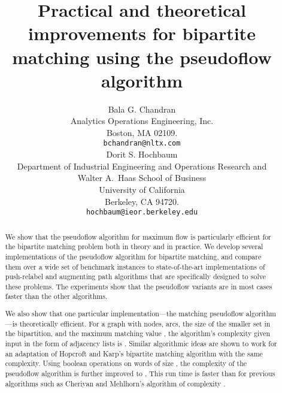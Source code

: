 \documentclass{article}
\begin{document}
\title{Practical and theoretical improvements for bipartite matching using the pseudoflow algorithm}
\author{Bala G. Chandran\\
\small Analytics Operations Engineering, Inc.\\
\small Boston, MA 02109. \\
\small {\tt bchandran@nltx.com}\medskip  \\
Dorit S. Hochbaum\\
\small Department of Industrial Engineering and Operations Research and\\
\small Walter A.\ Haas School of Business \\
\small University of California \\
\small Berkeley, CA 94720.\\
\small {\tt hochbaum@ieor.berkeley.edu}}

\date{}
\renewcommand{\baselinestretch}{1}

\maketitle

\renewcommand{\baselinestretch}{1.2}

\begin{abstract}
We show that the pseudoflow algorithm for maximum flow is particularly efficient for the bipartite matching problem both in theory and in practice. We develop several implementations of the pseudoflow algorithm for bipartite matching, and compare them over a wide set of benchmark instances to state-of-the-art implementations of push-relabel and augmenting path algorithms that are specifically designed to solve these problems.  The experiments show that the pseudoflow variants are in most cases faster than the other algorithms.

We also show that one particular implementation---the matching pseudoflow algorithm---is theoretically efficient.  For a graph with  nodes,  arcs,  the size of the smaller set in the bipartition, and the maximum matching value , the algorithm's complexity given input in the form of adjacency lists is \mbox{}.  Similar algorithmic ideas are shown to work for an adaptation of Hopcroft and Karp's bipartite matching algorithm with the same complexity.  Using boolean operations on words of size , the complexity of the pseudoflow algorithm is further improved to .  This run time is faster than for previous algorithms such as Cheriyan and Mehlhorn's algorithm of complexity .
\end{abstract}
\end{document}
